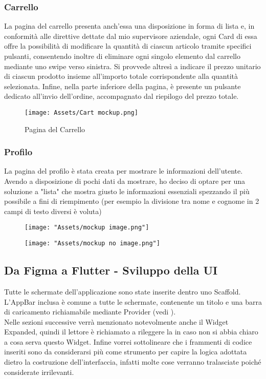 \subsubsection{Carrello}
La pagina del carrello presenta anch'essa una disposizione in forma di lista e, in conformità alle direttive dettate dal mio supervisore aziendale, ogni Card di essa offre la possibilità di modificare la quantità di ciascun articolo tramite specifici pulsanti, consentendo inoltre di eliminare ogni singolo elemento dal carrello mediante uno swipe verso sinistra. Si provvede altresì a indicare il prezzo unitario di ciascun prodotto insieme all'importo totale corrispondente alla quantità selezionata. Infine, nella parte inferiore della pagina, è presente un pulsante dedicato all'invio dell'ordine, accompagnato dal riepilogo del prezzo totale.
\begin{figure}[H]
    \centering
    \texttt{[image: Assets/Cart mockup.png]}
    \caption{Pagina del Carrello}
    \label{fig:figma_cart}
\end{figure}

\newpage
\subsubsection{Profilo}
La pagina del profilo è stata creata per mostrare le informazioni dell'utente. Avendo a disposizione di pochi dati da mostrare, ho deciso di optare per una soluzione a "lista" che mostra giusto le informazioni essenziali spezzando il più possibile a fini di riempimento (per esempio la divisione tra nome e cognome in 2 campi di testo diversi è voluta)
\begin{figure}[H]
\centering
	\begin{minipage}[t]{\ImageSize\linewidth}
		\texttt{[image: "Assets/mockup image.png"]}
	\end{minipage}
	\hspace{1em}
	\begin{minipage}[t]{\ImageSize\linewidth}
		\texttt{[image: "Assets/mockup no image.png"]}
	\end{minipage}
	\label{fig:figma_profile}
\end{figure}


\subsection{Da Figma a Flutter - Sviluppo della UI}
Tutte le schermate dell'applicazione sono state inserite dentro uno Scaffold. L'AppBar inclusa è comune a tutte le schermate, contenente un titolo e una barra di caricamento richiamabile mediante Provider (vedi ).\\
Nelle sezioni successive verrà menzionato notevolmente anche il Widget Expanded, quindi il lettore è richiamato a rileggere la  in caso non si abbia chiaro a cosa serva questo Widget.
Infine vorrei sottolineare che i frammenti di codice inseriti sono da considerarsi più come strumento per capire la logica adottata dietro la costruzione dell'interfaccia, infatti molte cose verranno tralasciate poiché considerate irrilevanti.

